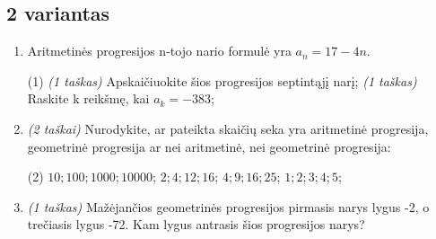 \documentclass[a4paper]{article}
\begin{document}
\subsection*{2 variantas}

\begin{enumerate}
      \item Aritmetinės progresijos n-tojo nario formulė yra $a_{n}=17-4n$.

            \begin{tasks}[item-format={\normalfont}, after-item-skip=2mm](1)
                  \task \textit{(1 taškas)} Apskaičiuokite šios progresijos
                  septintąjį narį;
                  \task \textit{(1 taškas)} Raskite k reikšmę, kai $a_k=-383$;
            \end{tasks}

      \item \textit{(2 taškai)} Nurodykite, ar pateikta skaičių seka yra
            aritmetinė progresija, geometrinė progresija ar nei aritmetinė, nei
            geometrinė progresija:
            \begin{tasks}[item-format={\normalfont}, after-item-skip=2mm](2)
                  \task $10; 100; 1000; 10000$;
                  \task $2;4;12;16$;
                  \task $4; 9; 16; 25$;
                  \task $1;2;3;4;5$;
            \end{tasks}

      \item \textit{(1 taškas)} Mažėjančios geometrinės progresijos pirmasis
            narys lygus -2, o trečiasis lygus -72. Kam lygus antrasis šios
            progresijos narys?


\end{enumerate}
\end{document}
